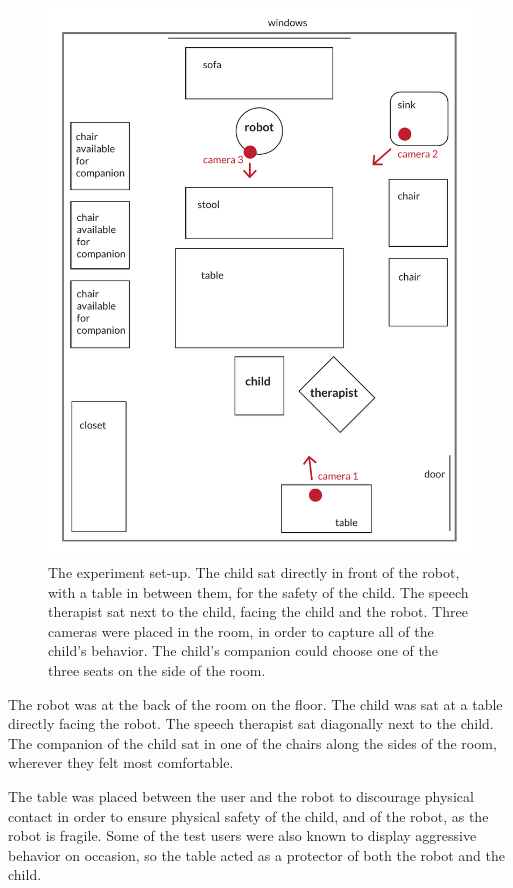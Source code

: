 \begin{figure}
  \includegraphics[width=\linewidth]{images/room_setup.pdf}
  \caption{The experiment set-up. The child sat directly in front of the robot, with a table in between them, for the safety of the child. The speech therapist sat next to the child, facing the child and the robot. Three cameras were placed in the room, in order to capture all of the child's behavior. The child's companion could choose one of the three seats on the side of the room.}
  \label{fig:roomSetup}
\end{figure}

The robot was at the back of the room on the floor. The child was sat at a table directly facing the robot. The speech therapist sat diagonally next to the child. The companion of the child sat in one of the chairs along the sides of the room, wherever they felt most comfortable.

The table was placed between the user and the robot to discourage physical contact in order to ensure physical safety of the child, and of the robot, as the robot is fragile. Some of the test users were also known to display aggressive behavior on occasion, so the table acted as a protector of both the robot and the child.

